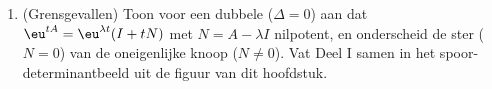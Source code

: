 \begin{problem}
\begin{enumerate}
         geschreven als $\alpha \pm \iu\beta$, de banen
        met behulp van \cref{exo:b2:diffeq:5} (na een reële
        basisverandering, in die algemeenheid aangenomen of
        bewezen voor de stelsels van Deel II, die hieronder worden
        gebruikt): spiralen die convergeren voor $\alpha =
        \frac\tau2 < 0$, divergeren voor $\tau > 0$, en gesloten
        krommen (centrum) voor $\tau = 0$.
  \item (Grensgevallen) Toon voor een dubbele  ($\Delta
        = 0$) aan dat $\eu^{tA} = \eu^{\lambda t}(I + tN)$ met $N
        = A - \lambda I$ nilpotent, en onderscheid de ster ($N =
        0$) van de oneigenlijke knoop ($N \neq 0$). Vat Deel I
        samen in het spoor-determinantbeeld uit de figuur van dit
        hoofdstuk.
\end{enumerate}


\end{problem}
